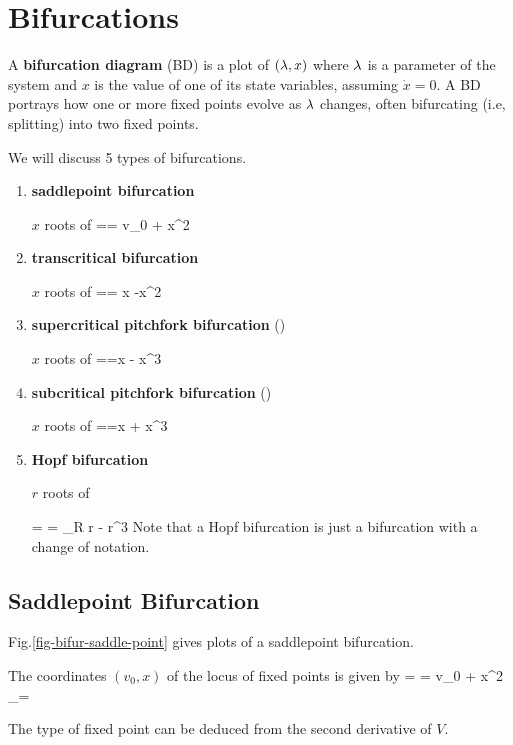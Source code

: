 \section{Bifurcations}

A {\bf bifurcation diagram}
(BD)
is a plot of $(\lambda, x)$
where $\lambda$ is
a parameter of the
system and $x$
is the value of one
of its  state
variables, assuming 
$\dot{x}=0$. A BD portrays
how one or more fixed points evolve
as $\lambda$ changes, often 
bifurcating (i.e, splitting) into two fixed points.

We will  discuss 5 types of bifurcations.

\begin{enumerate}
\item {\bf saddlepoint bifurcation}

$x$ roots of
== v_0 + x^2
\eeq

\item{\bf transcritical bifurcation}

$x$ roots of
== \lam x -x^2
\eeq
\item {\bf supercritical pitchfork bifurcation} (\supercri)

$x$  roots of
==\lam x - x^3
\eeq
\item {\bf subcritical pitchfork bifurcation} (\subcri)

$x$ roots of 
==\lam x + x^3
\eeq

\item {\bf Hopf bifurcation}

$r$ roots of

= = \mu_R r - r^3
\eeq
Note that a Hopf bifurcation is just a \supercri bifurcation with a change of notation.

\end{enumerate}




\subsection{Saddlepoint Bifurcation}

Fig.\ref{fig-bifur-saddle-point} gives plots of a saddlepoint
bifurcation.

The coordinates $(v_0, x)$ of the locus 
of fixed points is given by
=  = v_0 + x^2 \implies
 _{\pm}=\pm {}
 \eeq
 
 The type of
 fixed point can be 
 deduced from the second derivative
 of $V$.
 
